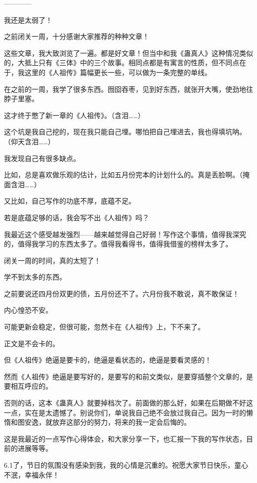 \begin{this_body}
------------

我还是太弱了！

之前闭关一周，十分感谢大家推荐的种种文章！

这些文章，我大致浏览了一遍。都是好文章！但当中和我《蛊真人》这种情况类似的，大抵上只有《三体》中的三个故事。相同点都是有寓言的性质，但不同点在于，我这里的《人祖传》篇幅更长一些，可以做为一条完整的单线。

在之前的一周，我学了很多东西。囫囵吞枣，见到好东西，就张开大嘴，使劲地往脖子里塞。

这才终于憋了新一章的《人祖传》。（含泪……）

这个坑是我自己挖的，现在我只能自己埋。哪怕把自己埋进去，我也得填坑呐。（仰天含泪……）

我发现自己有很多缺点。

比如，总是喜欢做乐观的估计，比如五月份完本的计划什么的。真是丢脸啊。（掩面含泪……）

又比如，自己写作的功底不厚，底蕴不足。

若是底蕴足够的话，我会写不出《人祖传》吗？

我最近这个感受越发强烈——越来越觉得自己好弱！写作这个事情，值得我深究的，值得我学习的东西太多了。值得我看得书，值得我借鉴的榜样太多了。

闭关一周的时间，真的太短了！

学不到太多的东西。

之前要说还四月份双更的债，五月份还不了。六月份我不敢说，真不敢保证！

内心惶恐不安。

可能更新会稳定，但很可能，忽然卡在《人祖传》上，下不来了。

正文是不会卡的。

但《人祖传》绝逼是要卡的，绝逼是看状态的，绝逼是要看灵感的！

然而《人祖传》绝逼是要写好的，是要写的和前文类似，是要穿插整个文章的，是要相互呼应的。

否则的话，这本《蛊真人》就要掉档次了。前面做的那么好，如果在后期做不好这一点，实在是太遗憾了。别说你们，单说我自己绝不会放过我自己。因为一时的懒惰和图安逸，就放弃这部分的努力，将来的我一定会后悔的。

这是我最近的一点写作心得体会，和大家分享一下，也汇报一下我的写作状态，目前的进展等等。

6.1了，节日的氛围没有感染到我，我的心情是沉重的。祝愿大家节日快乐，童心不泯，幸福永伴！

\end{this_body}

